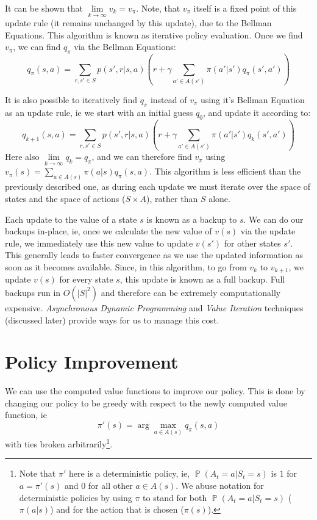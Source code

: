 \documentclass[12pt]{report}
\begin{document}
It can be shown that $\lim\limits_{k \rightarrow \infty} v_{k} = v_{\pi}$. Note, that $v_{\pi}$ itself is a fixed point of this update rule (it remains unchanged by this update), due to the Bellman Equations. This algorithm 
is known as iterative policy evaluation. Once we find $v_{\pi}$, we can find $q_{\pi}$ via the Bellman Equations:
\begin{equation}
    q_{\pi}(s, a) = \sum\limits_{r, s' \in S} p(s', r | s, a)(r + \gamma\sum\limits_{a' \in A(s')}\pi(a' | s') q_{\pi}(s', a'))
\end{equation}

It is also possible to iteratively find $q_{\pi}$ instead of $v_{\pi}$ using it's Bellman Equation as an update rule, ie we start with an initial guess $q_{0}$, and update it according to:
\begin{equation}
    q_{k + 1}(s, a) = \sum\limits_{r, s' \in S} p(s', r | s, a)(r + \gamma\sum\limits_{a' \in A(s')}\pi(a' | s') q_{k}(s', a'))
\end{equation}
Here also $\lim\limits_{k \rightarrow \infty} q_{k} = q_{\pi}$, and we can therefore find $v_{\pi}$ using $v_{\pi}(s) = \sum\limits_{a \in A(s)} \pi(a | s) q_{\pi}(s, a)$. This algorithm is less efficient than the previously described one, as during each update we must iterate over the space of states and the space of actions ($S \times A$), rather than $S$ alone.

Each update to the value of a state $s$ is known as a backup to $s$. We can do our backups in-place, ie, once we calculate the new value of $v(s)$ via the update rule, we immediately use this new value to update $v(s')$ for other states $s'$. This generally leads to faster convergence as we use the updated information as soon as it becomes available.
Since, in this algorithm, to go from $v_{k}$ to $v_{k + 1}$, we update $v(s)$ for every state $s$, this update is known as a full backup. Full backups run in $O(\left|S\right|^{2})$ and therefore can be extremely computationally expensive. \textit{Asynchronous Dynamic Programming} and \textit{Value Iteration} techniques (discussed later) provide ways for us to manage this cost.


\section{Policy Improvement}
We can use the computed value functions to improve our policy. This is done by changing our policy to be greedy with respect to the newly computed value function, ie 
\begin{equation}
    \pi'(s) = \arg\max\limits_{a \in A(s)} q_{\pi}(s, a)
\end{equation}
with ties broken arbitrarily\footnote{Note that $\pi'$ here is a deterministic policy, ie, $\mathop{\mathbb{P}}(A_{t} = a | S_{t} = s)$ is $1$ for $a = \pi'(s)$ and $0$ for all other $a \in A(s)$. We abuse notation for deterministic policies by using $\pi$ to stand for both $\mathop{\mathbb{P}}(A_{t} = a | S_{t} = s)$ ($\pi(a | s)$) and for the action that is chosen ($\pi(s)$).}.
\end{document}
